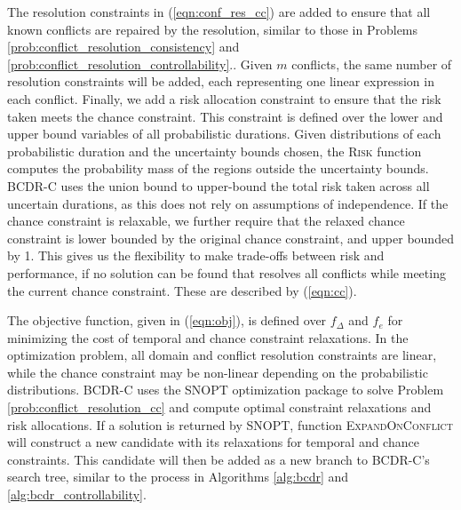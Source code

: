 \documentclass[jair,twoside,11pt,theapa]{article}
\begin{document}
The resolution constraints in (\ref{eqn:conf_res_cc}) are added to ensure that
all known conflicts are repaired by the resolution, similar to those in Problems
\ref{prob:conflict_resolution_consistency} and \ref{prob:conflict_resolution_controllability}.. Given $m$ conflicts, the same number
of resolution constraints will be added, each representing one linear expression
in each conflict. Finally, we add a risk allocation constraint to ensure that
the risk taken meets the chance constraint. This constraint is defined over the
lower and upper bound variables of all probabilistic durations. Given
distributions of each probabilistic duration and the uncertainty bounds chosen,
the \textsc{Risk} function computes the probability mass of the regions outside
the uncertainty bounds. BCDR-C uses the union bound to upper-bound the total
risk taken across all uncertain durations, as this does not rely on assumptions
of independence. If the chance constraint is relaxable, we further require that
the relaxed chance constraint is lower bounded by the original chance
constraint, and upper bounded by 1. This gives us the flexibility to make
trade-offs between risk and performance, if no solution can be found that
resolves all conflicts while meeting the current chance constraint. These are
described by (\ref{eqn:cc}).


The objective function, given in (\ref{eqn:obj}), is defined over $f_\Delta$ and
$f_{e}$ for minimizing the cost of temporal and chance constraint relaxations.
In the optimization problem, all domain and conflict resolution constraints are
linear, while the chance constraint may be non-linear depending on the
probabilistic distributions. BCDR-C uses the SNOPT optimization package
\cite{Wachter06onthe} to solve Problem \ref{prob:conflict_resolution_cc} and
compute optimal constraint relaxations and risk allocations. If a solution is
returned by SNOPT, function \textsc{ExpandOnConflict} will construct a new
candidate with its relaxations for temporal and chance constraints. This
candidate will then be added as a new branch to BCDR-C's search tree, similar to
the process in Algorithms \ref{alg:bcdr} and \ref{alg:bcdr_controllability}. 

\end{document}
